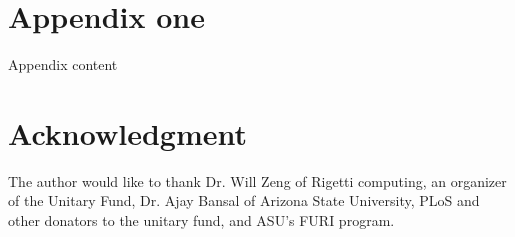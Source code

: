\documentclass[journal]{article}
\begin{document}
 \section{Appendix one}
Appendix content

\section*{Acknowledgment}

The author would like to thank Dr. Will Zeng of Rigetti computing, an organizer of the Unitary Fund, Dr. Ajay Bansal of Arizona State University, PLoS and other donators to the unitary fund, and ASU's FURI program.




%
%
%

\begin{thebibliography}{1}


\end{thebibliography}

\end{document}
